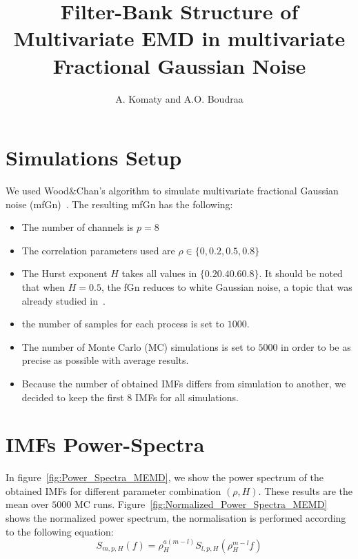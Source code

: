 \documentclass[oneside,11pt]{paper}
\begin{document}
\title{Filter-Bank Structure of Multivariate EMD in multivariate Fractional Gaussian Noise}

\author{A. Komaty and A.O. Boudraa}

\maketitle

\section{Simulations Setup}

We used Wood$\&$Chan's algorithm to simulate multivariate fractional Gaussian noise (mfGn)~\cite{Amblard2010}. The resulting mfGn has the following:
\begin{itemize}
\item The number of channels is $p=8$
\item The correlation parameters used are $\rho \in \{0, 0.2, 0.5, 0.8 \}$
\item The Hurst exponent $H$ takes all values in $\{ 0.2 0.4 0.6 0.8 \}$. It should be noted that when $H=0.5$, the fGn reduces to white Gaussian noise, a topic that was already studied in~\cite{Rehman2011}.
\item the number of samples for each process is set to $1000$.
\item The number of Monte Carlo (MC) simulations is set to $5000$ in order to be as precise as possible with average results.
\item Because the number of obtained IMFs differs from simulation to another, we decided to keep the first $8$ IMFs for all simulations.
\end{itemize}

\section{IMFs Power-Spectra}
In figure~\ref{fig:Power_Spectra_MEMD}, we show the power spectrum of the obtained IMFs for different parameter combination $(\rho, H)$. These results are the mean over $5000$ MC runs. Figure~\ref{fig:Normalized_Power_Spectra_MEMD} shows the normalized power spectrum, the normalisation is performed according to the following equation:
\begin{equation}
S_{m,p,H}(f)=\rho_H^{a(m-l)} S_{l,p,H}(\rho_H^{m-l} f)
\label{eq: S_k_rho}
\end{equation}
\end{document}
